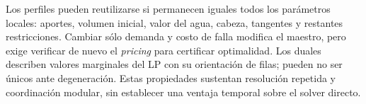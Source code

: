 Los perfiles pueden reutilizarse si permanecen iguales todos los parámetros locales: aportes, volumen inicial, valor del agua, cabeza, tangentes y restantes restricciones. Cambiar sólo demanda y costo de falla modifica el maestro, pero exige verificar de nuevo el \emph{pricing} para certificar optimalidad. Los duales describen valores marginales del LP con su orientación de filas; pueden no ser únicos ante degeneración. Estas propiedades sustentan resolución repetida y coordinación modular, sin establecer una ventaja temporal sobre el solver directo.
